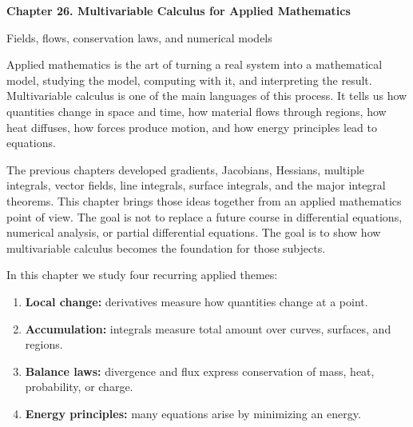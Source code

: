 \documentclass[11pt]{article}
\begin{document}
\begin{center}
  {\LARGE\bfseries Chapter 26. Multivariable Calculus for Applied Mathematics\par}
  \vspace{0.3em}
  {\large Fields, flows, conservation laws, and numerical models\par}
\end{center}

\begin{chapterbox}
Applied mathematics is the art of turning a real system into a mathematical model, studying the model, computing with it, and interpreting the result. Multivariable calculus is one of the main languages of this process. It tells us how quantities change in space and time, how material flows through regions, how heat diffuses, how forces produce motion, and how energy principles lead to equations.

The previous chapters developed gradients, Jacobians, Hessians, multiple integrals, vector fields, line integrals, surface integrals, and the major integral theorems. This chapter brings those ideas together from an applied mathematics point of view. The goal is not to replace a future course in differential equations, numerical analysis, or partial differential equations. The goal is to show how multivariable calculus becomes the foundation for those subjects.
\end{chapterbox}

In this chapter we study four recurring applied themes:
\begin{enumerate}
  \item \textbf{Local change:} derivatives measure how quantities change at a point.
  \item \textbf{Accumulation:} integrals measure total amount over curves, surfaces, and regions.
  \item \textbf{Balance laws:} divergence and flux express conservation of mass, heat, probability, or charge.
  \item \textbf{Energy principles:} many equations arise by minimizing an energy.
\end{enumerate}
\end{document}

